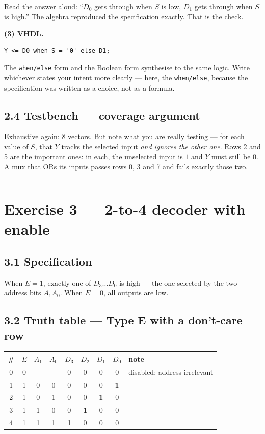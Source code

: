 \documentclass[11pt]{article}
\newcommand{\code}[1]{\texttt{#1}}
\newcommand{\hr}{\vspace{2pt}\hrule\vspace{6pt}}
\begin{document}
Read the answer aloud: ``$D_0$ gets through when $S$ is low, $D_1$ gets through when
$S$ is high.'' The algebra reproduced the specification exactly. That is the check.

\textbf{(3) VHDL.}
\begin{lstlisting}
Y <= D0 when S = '0' else D1;
\end{lstlisting}

The \code{when/else} form and the Boolean form synthesise to the same logic. Write
whichever states your intent more clearly --- here, the \code{when/else}, because
the specification was written as a choice, not as a formula.

\subsection*{2.4 Testbench --- coverage argument}

Exhaustive again: 8 vectors. But note what you are really testing --- for each value
of $S$, that $Y$ tracks the selected input \emph{and ignores the other one}. Rows 2
and 5 are the important ones: in each, the unselected input is $1$ and $Y$ must
still be $0$. A mux that ORs its inputs passes rows 0, 3 and 7 and fails exactly
those two.

\vspace{4pt}\hr

\section*{Exercise 3 --- 2-to-4 decoder with enable}

\subsection*{3.1 Specification}

When $E = 1$, exactly one of $D_3 \ldots D_0$ is high --- the one selected by the
two address bits $A_1 A_0$. When $E = 0$, all outputs are low.

\subsection*{3.2 Truth table --- Type E with a don't-care row}

\begin{center}
\begin{tabular}{c|ccc|cccc|l}
\toprule
\# & $E$ & $A_1$ & $A_0$ & $D_3$ & $D_2$ & $D_1$ & $D_0$ & note \\
\midrule
0 & 0 & -- & -- & 0 & 0 & 0 & 0 & disabled; address irrelevant \\
1 & 1 & 0 & 0 & 0 & 0 & 0 & \textbf{1} & \\
2 & 1 & 0 & 1 & 0 & 0 & \textbf{1} & 0 & \\
3 & 1 & 1 & 0 & 0 & \textbf{1} & 0 & 0 & \\
4 & 1 & 1 & 1 & \textbf{1} & 0 & 0 & 0 & \\
\bottomrule
\end{tabular}
\end{center}
\end{document}
